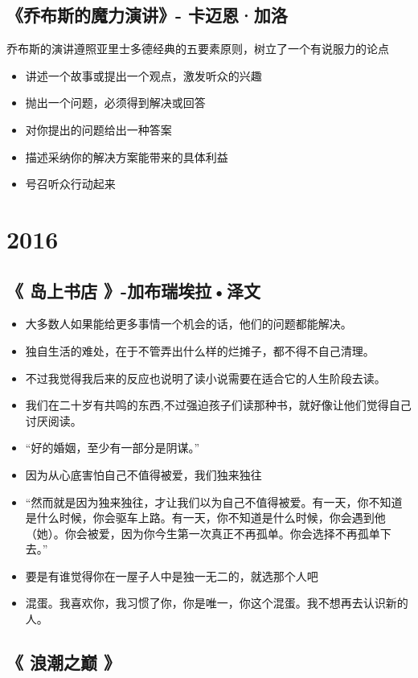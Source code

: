 \documentclass[UTF8,a4paper,8pt]{ctexbook}
\begin{document}
	\newpage
	\section{《乔布斯的魔力演讲》- 卡迈恩·加洛}
		乔布斯的演讲遵照亚里士多德经典的五要素原则，树立了一个有说服力的论点
		\begin{itemize}
			\item 讲述一个故事或提出一个观点，激发听众的兴趣
			\item 抛出一个问题，必须得到解决或回答
			\item 对你提出的问题给出一种答案
			\item 描述采纳你的解决方案能带来的具体利益
			\item 号召听众行动起来
		\end{itemize}
\chapter{2016}  
	\section{《 岛上书店 》-加布瑞埃拉•泽文  }
		\begin{itemize}
			\item 大多数人如果能给更多事情一个机会的话，他们的问题都能解决。
			\item 独自生活的难处，在于不管弄出什么样的烂摊子，都不得不自己清理。
			\item 不过我觉得我后来的反应也说明了读小说需要在适合它的人生阶段去读。
			\item 我们在二十岁有共鸣的东西,不过强迫孩子们读那种书，就好像让他们觉得自己讨厌阅读。
			\item “好的婚姻，至少有一部分是阴谋。”
			\item 因为从心底害怕自己不值得被爱，我们独来独往
			\item “然而就是因为独来独往，才让我们以为自己不值得被爱。有一天，你不知道是什么时候，你会驱车上路。有一天，你不知道是什么时候，你会遇到他（她）。你会被爱，因为你今生第一次真正不再孤单。你会选择不再孤单下去。”
			\item 要是有谁觉得你在一屋子人中是独一无二的，就选那个人吧
			\item 混蛋。我喜欢你，我习惯了你，你是唯一，你这个混蛋。我不想再去认识新的人。
		\end{itemize}
		\newpage
    \section{《 浪潮之巅 》 }
    
\end{document}
